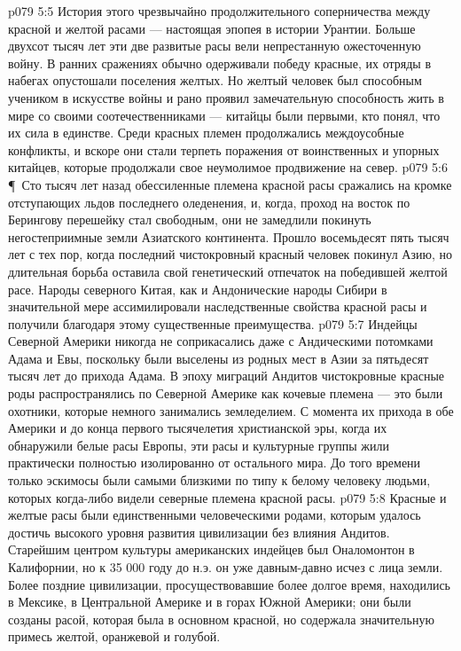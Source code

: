 \vs p079 5:5 История этого чрезвычайно продолжительного соперничества между красной и желтой расами --- настоящая эпопея в истории Урантии. Больше двухсот тысяч лет эти две развитые расы вели непрестанную ожесточенную войну. В ранних сражениях обычно одерживали победу красные, их отряды в набегах опустошали поселения желтых. Но желтый человек был способным учеником в искусстве войны и рано проявил замечательную способность жить в мире со своими соотечественниками --- китайцы были первыми, кто понял, что их сила в единстве. Среди красных племен продолжались междоусобные конфликты, и вскоре они стали терпеть поражения от воинственных и упорных китайцев, которые продолжали свое неумолимое продвижение на север.
\vs p079 5:6 \P\ Сто тысяч лет назад обессиленные племена красной расы сражались на кромке отступающих льдов последнего оледенения, и, когда, проход на восток по Берингову перешейку стал свободным, они не замедлили покинуть негостеприимные земли Азиатского континента. Прошло восемьдесят пять тысяч лет с тех пор, когда последний чистокровный красный человек покинул Азию, но длительная борьба оставила свой генетический отпечаток на победившей желтой расе. Народы северного Китая, как и Андонические народы Сибири в значительной мере ассимилировали наследственные свойства красной расы и получили благодаря этому существенные преимущества.
\vs p079 5:7 Индейцы Северной Америки никогда не соприкасались даже с Андическими потомками Адама и Евы, поскольку были выселены из родных мест в Азии за пятьдесят тысяч лет до прихода Адама. В эпоху миграций Андитов чистокровные красные роды распространялись по Северной Америке как кочевые племена --- это были охотники, которые немного занимались земледелием. С момента их прихода в обе Америки и до конца первого тысячелетия христианской эры, когда их обнаружили белые расы Европы, эти расы и культурные группы жили практически полностью изолированно от остального мира. До того времени только эскимосы были самыми близкими по типу к белому человеку людьми, которых когда\hyp{}либо видели северные племена красной расы.
\vs p079 5:8 Красные и желтые расы были единственными человеческими родами, которым удалось достичь высокого уровня развития цивилизации без влияния Андитов. Старейшим центром культуры американских индейцев был Оналомонтон в Калифорнии, но к 35 000 году до н.э. он уже давным\hyp{}давно исчез с лица земли. Более поздние цивилизации, просуществовавшие более долгое время, находились в Мексике, в Центральной Америке и в горах Южной Америки; они были созданы расой, которая была в основном красной, но содержала значительную примесь желтой, оранжевой и голубой.
